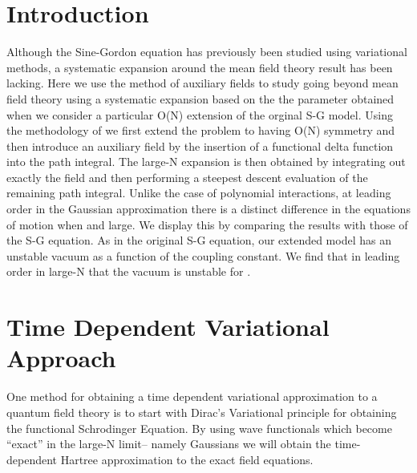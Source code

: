 \documentclass[a4paper,prd,preprint,superscriptaddress,showpacs,byrevtex]{revtex4}
\begin{document}
\section{Introduction}
Although the Sine-Gordon equation has previously been studied using
variational
methods, \cite{ref:Coleman} \cite{ref:Boy}
a systematic expansion around the mean field theory result has been lacking.
Here we use the method of auxiliary fields to study going beyond mean field
theory using a systematic expansion based on the the parameter \coordHE{} obtained
when we consider a particular O(N) extension of the orginal S-G model.
Using the methodology of \cite{div}   \cite{ref:Eyal} we first extend the
problem to having O(N) symmetry and then introduce an auxiliary field \coordHE{} by the insertion of a functional delta function
into the path integral. The large-N expansion is then obtained by
integrating
out exactly the \myHighlight{$\phi$}\coordHE{} field and then performing a steepest descent
evaluation
of the remaining path integral.  Unlike the case of polynomial interactions,
at leading order in the Gaussian approximation there is a distinct
difference
in the equations of motion when \coordHE{} and \coordHE{} large.  We display this
by comparing the \coordHE{} results with those of the S-G equation.
As in the original S-G equation, our \coordHE{} extended model has an unstable
vacuum as a function of the coupling constant.  We find that in leading
order
in large-N that  the vacuum is unstable for \myHighlight{$ \beta^2 \geq 24 \pi$}\coordHE{}.

\section{Time Dependent Variational Approach}
  One method for obtaining a time dependent
variational approximation to a quantum field theory is to
start with Dirac's Variational principle \cite{ref:Dirac} \cite{ref:Hartree}for
obtaining the functional Schrodinger Equation. By using wave functionals which
become ``exact'' in the
large-N limit-- namely Gaussians we will obtain the time-dependent Hartree
approximation to the exact field equations.
\end{document}
